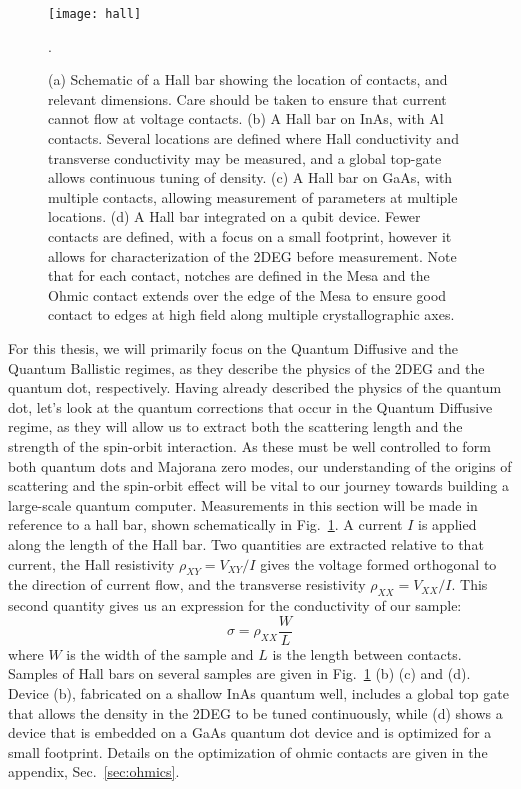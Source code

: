 \begin{figure}
  \texttt{[image: hall]}
  \caption[Schematic of a Hall bar and several devices]
  {\label{fig:hall}(a) Schematic of a Hall bar showing the location of contacts, and relevant dimensions. Care should be taken to ensure that current cannot flow at voltage contacts. (b) A Hall bar on InAs, with Al contacts. Several locations are defined where Hall conductivity and transverse conductivity may be measured, and a global top-gate allows continuous tuning of density. (c) A Hall bar on GaAs, with multiple contacts, allowing measurement of parameters at multiple locations. (d) A Hall bar integrated on a qubit device. Fewer contacts are defined, with a focus on a small footprint, however it allows for characterization of the 2DEG before measurement. Note that for each contact, notches are defined in the Mesa and the Ohmic contact extends over the edge of the Mesa to ensure good contact to edges at high field along multiple crystallographic axes.}.
\end{figure}

For this thesis, we will primarily focus on the Quantum Diffusive and the Quantum Ballistic regimes, as they describe the physics of the
2DEG and the quantum dot, respectively. Having already described the physics of the quantum dot, let's look at the quantum corrections that occur
in the Quantum Diffusive regime, as they will allow us to extract both the scattering length and the strength of the spin-orbit interaction. As these must be well controlled to form both quantum dots and Majorana zero modes, our understanding of the origins of
scattering and the spin-orbit effect will be vital to our journey towards building a large-scale quantum computer. Measurements in this section
will be made in reference to a hall bar, shown schematically in Fig.~\ref{fig:hall}. A current $I$ is applied along the length of the Hall bar.
Two quantities are extracted relative to that current, the Hall resistivity $\rho_{XY} = V_{XY}/I$ gives
the voltage formed orthogonal to the direction of current flow, and the transverse resistivity $\rho_{XX} = V_{XX}/I$.
This second quantity gives us an expression for the conductivity of our sample:
\begin{equation}
  \sigma = \rho_{XX} \frac{W}{L}
\end{equation}
where $W$ is the width of the sample and $L$ is the length between contacts. Samples of Hall bars on several samples are given in Fig.~\ref{fig:hall} (b)
(c) and (d). Device (b), fabricated on a shallow InAs quantum well, includes a global top gate that allows the density in the 2DEG to be tuned continuously,
while (d) shows a device that is embedded on a GaAs quantum dot device and is optimized for a small footprint. Details on the optimization of ohmic contacts
are given in the appendix, Sec.~\ref{sec:ohmics}.

